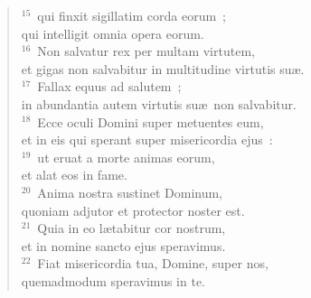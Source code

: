 \begin{flushleft}
\begin{verse}
${}^{15}$~qui finxit sigillatim corda eorum~;\\ qui intelligit omnia opera eorum.\\
${}^{16}$~Non salvatur rex per multam virtutem,\\ et gigas non salvabitur in multitudine virtutis su\ae .\\
${}^{17}$~Fallax equus ad salutem~;\\ in abundantia autem virtutis su\ae\ non salvabitur.\\
${}^{18}$~Ecce oculi Domini super metuentes eum,\\ et in eis qui sperant super misericordia ejus~:\\
${}^{19}$~ut eruat a morte animas eorum,\\ et alat eos in fame.\\
${}^{20}$~Anima nostra sustinet Dominum,\\ quoniam adjutor et protector noster est.\\
${}^{21}$~Quia in eo l\ae tabitur cor nostrum,\\ et in nomine sancto ejus speravimus.\\
${}^{22}$~Fiat misericordia tua, Domine, super nos,\\ quemadmodum speravimus in te.\end{verse}\end{flushleft}


